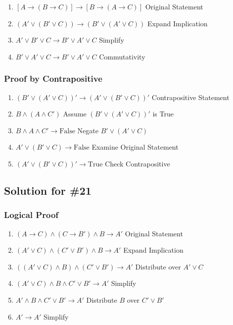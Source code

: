 \documentclass[12pt]{article}
\begin{document}
\begin{enumerate}
    \item \( [A \to (B \to C)] \to [B \to (A \to C)] \) \hfill Original Statement
    \item \( (A' \lor (B' \lor C)) \to (B' \lor (A' \lor C)) \) \hfill Expand Implication
    \item \( A' \lor B' \lor C \to B' \lor A' \lor C \) \hfill Simplify
    \item \( B' \lor A' \lor C \to B' \lor A' \lor C \) \hfill Commutativity
\end{enumerate}

\subsubsection*{Proof by Contrapositive}

\begin{enumerate}
    \item \( (B' \lor (A' \lor C))' \to (A' \lor (B' \lor C))' \) \hfill Contrapositive Statement
    \item \( B \land (A \land C') \) \hfill Assume \( (B' \lor (A' \lor C))' \) is True
    \item \( B \land A \land C' \to \text{False} \) \hfill Negate \( B' \lor (A' \lor C) \)
    \item \( A' \lor (B' \lor C) \to \text{False} \) \hfill Examine Original Statement
    \item \( (A' \lor (B' \lor C))' \to \text{True} \) \hfill Check Contrapositive
\end{enumerate}

\newpage
\subsection*{Solution for \#21}

\subsubsection*{Logical Proof}

\begin{enumerate}
    \item \( (A \to C) \land (C \to B') \land B \to A' \) \hfill Original Statement
    \item \( (A' \lor C) \land (C' \lor B') \land B \to A' \) \hfill Expand Implication
    \item \( ((A' \lor C) \land B) \land (C' \lor B') \to A' \) \hfill Distribute over \( A' \lor C \)
    \item \( (A' \lor C) \land B \land C' \lor B' \to A' \) \hfill Simplify
    \item \( A' \land B \land C' \lor B' \to A' \) \hfill Distribute \( B \) over \( C' \lor B' \)
    \item \( A' \to A' \) \hfill Simplify
\end{enumerate}
\end{document}
